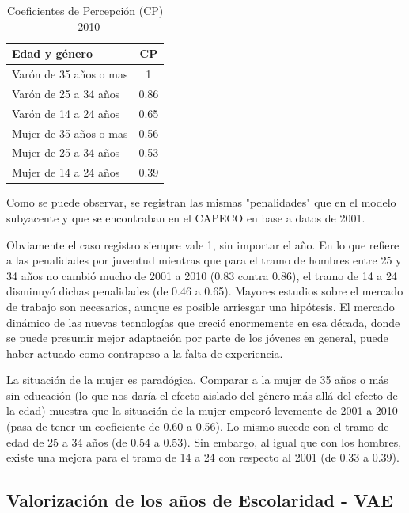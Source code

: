 \begin{table}[h!]
	\centering
	\caption{Coeficientes de Percepción (CP) - 2010}
	\label{tab:tableCP}
	\begin{tabular}{l|c}
		Edad y género & CP \\
		\hline
		\hline
		Varón de 35 años o mas & 1 \\
		\hline
		Varón de 25 a 34 años & 0.86 \\
		\hline
		Varón de 14 a 24  años & 0.65 \\
		\hline
		Mujer de 35 años o mas & 0.56 \\
		\hline
		Mujer de 25 a 34 años & 0.53 \\
		\hline
		Mujer de 14 a 24  años & 0.39 \\
		
	\end{tabular}
\end{table}



Como se puede observar, se registran las mismas "penalidades" que en el modelo subyacente y que se encontraban en el CAPECO en base a datos de 2001.

Obviamente el caso registro siempre vale 1, sin importar el año. En lo que refiere a las penalidades por juventud mientras que para el tramo de hombres entre 25 y 34 años no cambió mucho de 2001 a 2010 (0.83 contra 0.86), el tramo de 14 a 24 disminuyó dichas penalidades (de 0.46 a 0.65). Mayores estudios sobre el mercado de trabajo son necesarios, aunque es posible arriesgar una hipótesis. El mercado dinámico de las nuevas tecnologías que creció enormemente en esa década, donde se puede presumir mejor adaptación por parte de los jóvenes en general, puede haber actuado como contrapeso a la falta de experiencia.

La situación de la mujer es paradógica. Comparar a la mujer de 35 años o más sin educación (lo que nos daría el efecto aislado del género más allá del efecto de la edad) muestra que la situación de la mujer empeoró levemente de 2001 a 2010 (pasa de tener un coeficiente de 0.60 a 0.56). Lo mismo sucede con el tramo de edad de 25 a 34 años (de 0.54 a 0.53). Sin embargo, al igual que con los hombres, existe una mejora para el tramo de 14 a 24 con respecto al 2001 (de 0.33 a 0.39).

\subsection{Valorización de los años de Escolaridad - VAE}


